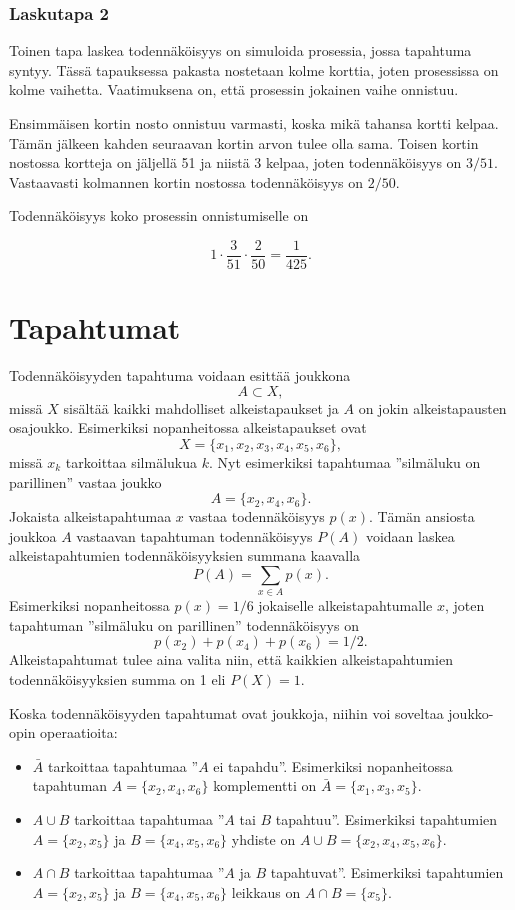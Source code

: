 \subsubsection*{Laskutapa 2}

Toinen tapa laskea todennäköisyys on simuloida prosessia,
jossa tapahtuma syntyy.
Tässä tapauksessa pakasta nostetaan kolme korttia,
joten prosessissa on kolme vaihetta.
Vaatimuksena on, että prosessin jokainen vaihe onnistuu.

Ensimmäisen kortin nosto onnistuu varmasti,
koska mikä tahansa kortti kelpaa.
Tämän jälkeen kahden seuraavan kortin
arvon tulee olla sama.
Toisen kortin nostossa kortteja on jäljellä 51
ja niistä 3 kelpaa, joten todennäköisyys on $3/51$.
Vastaavasti kolmannen kortin nostossa
todennäköisyys on $2/50$.

Todennäköisyys koko prosessin onnistumiselle on

\[1 \cdot \frac{3}{51} \cdot \frac{2}{50} = \frac{1}{425}.\]

\section{Tapahtumat}

Todennäköisyyden tapahtuma
voidaan esittää joukkona
\[A \subset X,\]
missä $X$ sisältää kaikki mahdolliset alkeistapaukset
ja $A$ on jokin alkeistapausten osajoukko.
Esimerkiksi nopanheitossa alkeistapaukset ovat
\[X = \{x_1,x_2,x_3,x_4,x_5,x_6\},\]
missä $x_k$ tarkoittaa silmälukua $k$.
Nyt esimerkiksi tapahtumaa ''silmäluku on parillinen''
vastaa joukko
\[A = \{x_2,x_4,x_6\}.\]
Jokaista alkeistapahtumaa $x$
vastaa todennäköisyys $p(x)$.
Tämän ansiosta joukkoa $A$ vastaavan tapahtuman
todennäköisyys $P(A)$ voidaan
laskea alkeistapahtumien todennäköisyyksien
summana kaavalla
\[P(A) = \sum_{x \in A} p(x).\]
Esimerkiksi nopanheitossa $p(x)=1/6$
jokaiselle alkeistapahtumalle $x$, joten
tapahtuman ''silmäluku on parillinen''
todennäköisyys on
\[p(x_2)+p(x_4)+p(x_6)=1/2.\]
Alkeistapahtumat tulee aina valita niin,
että kaikkien alkeistapahtumien
todennäköisyyksien summa on 1 eli $P(X)=1$.

Koska todennäköisyyden tapahtumat ovat joukkoja,
niihin voi soveltaa jouk\-ko-opin operaatioita:

\begin{itemize}
\item {} $\bar A$ tarkoittaa
tapahtumaa ''$A$ ei tapahdu''. 
Esimerkiksi nopanheitossa tapahtuman
$A=\{x_2,x_4,x_6\}$ komplementti on
$\bar A = \{x_1,x_3,x_5\}$.
\item {} $A \cup B$ tarkoittaa
tapahtumaa ''$A$ tai $B$ tapahtuu''.
Esimerkiksi tapahtumien $A=\{x_2,x_5\}$
ja $B=\{x_4,x_5,x_6\}$ yhdiste on
$A \cup B = \{x_2,x_4,x_5,x_6\}$.
\item {} $A \cap B$ tarkoittaa
tapahtumaa ''$A$ ja $B$ tapahtuvat''.
Esimerkiksi tapahtumien $A=\{x_2,x_5\}$
ja $B=\{x_4,x_5,x_6\}$ leikkaus on
$A \cap B = \{x_5\}$.
\end{itemize}

